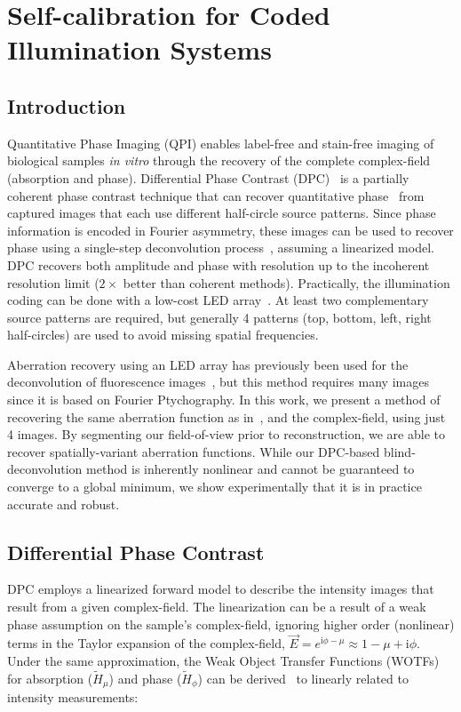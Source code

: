 
\chapter{Self-calibration for Coded Illumination Systems}

\section{Introduction}
Quantitative Phase Imaging (QPI) enables label-free and stain-free imaging of biological samples \emph{in vitro} through the recovery of the complete complex-field (absorption and phase). Differential Phase Contrast (DPC)~\cite{Hamilton1984a,Tian14} is a partially coherent phase contrast technique that can recover quantitative phase~\cite{mehta2009quantitative,tian2015quantitative} from captured images that each use different half-circle source patterns. Since phase information is encoded in Fourier asymmetry, these images can be used to recover phase using a single-step deconvolution process~\cite{mehta2009quantitative,tian2015quantitative}, assuming a linearized model. DPC recovers both amplitude and phase with resolution up to the incoherent resolution limit ($2\times$ better than coherent methods). Practically, the illumination coding can be done with a low-cost LED array~\cite{Tian14,zijiMulti,tian2015quantitative}. At least two complementary source patterns are required, but generally 4 patterns (top, bottom, left, right half-circles) are used to avoid missing spatial frequencies.

Aberration recovery using an LED array has previously been used for the deconvolution of fluorescence images~\cite{Ou:14}, but this method requires many images since it is based on Fourier Ptychography. In this work, we present a method of recovering the same aberration function as in~\cite{Ou:14}, and the complex-field, using just 4 images. By segmenting our field-of-view prior to reconstruction, we are able to recover spatially-variant aberration functions. While our DPC-based blind-deconvolution method is inherently nonlinear and cannot be guaranteed to converge to a global minimum, we show experimentally that it is in practice accurate and robust.

\section{Differential Phase Contrast}
DPC employs a linearized forward model to describe the intensity images that result from a given complex-field. The linearization can be a result of a weak phase assumption on the sample's complex-field, ignoring higher order (nonlinear) terms in the Taylor expansion of the complex-field, $\vec{E} = e^{\mathrm{i}\phi -\mu} \approx 1-\mu + \mathrm{i}\phi$.
Under the same approximation, the Weak Object Transfer Functions (WOTFs) for absorption ($\tilde{H}_{\mu}$) and phase ($\tilde{H}_{\phi}$) can be derived~\cite{Claus2015, tian2015quantitative, Hamilton1984a} to linearly related to intensity measurements:

